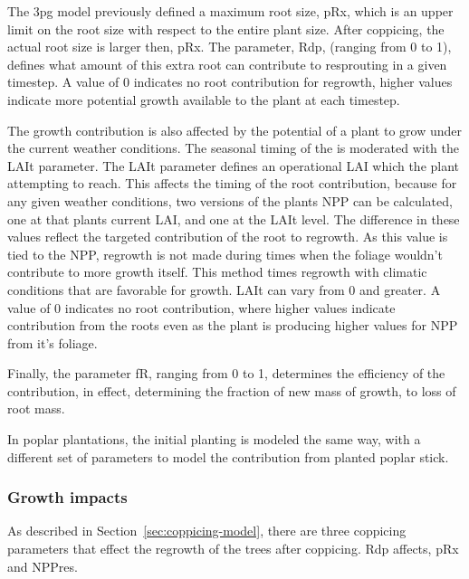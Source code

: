 \documentclass[10pt]{article}
\begin{document}
The \ac{3pg} model previously defined a maximum root size, \acs{pRx},
which is an upper limit on the root size with respect to the entire
plant size.  After coppicing, the actual root size is larger then,
\acs{pRx}.  The parameter, \acs{Rdp}, (ranging from 0 to 1), defines
what amount of this extra root can contribute to resprouting in a
given timestep.  A value of 0 indicates no root contribution for
regrowth, higher values indicate more potential growth available to
the plant at each timestep.

The growth contribution is also affected by the potential of a plant
to grow under the current weather conditions.  The seasonal timing of
the is moderated with the \acs{LAIt} parameter.  The \acs{LAIt}
parameter defines an operational \acs{LAI} which the plant attempting
to reach.  This affects the timing of the root contribution, because
for any given weather conditions, two versions of the plants \ac{NPP}
can be calculated, one at that plants current \acs{LAI}, and one at
the \acs{LAIt} level.  The difference in these values reflect the
targeted contribution of the root to regrowth.  As this value is
tied to the \ac{NPP}, regrowth is not made during times when the
foliage wouldn't contribute to more growth itself.  This method times
regrowth with climatic conditions that are favorable for growth.
\acs{LAIt} can vary from 0 and greater.  A value of 0 indicates no
root contribution, where higher values indicate contribution from the
roots even as the plant is producing higher values for \acs{NPP} from
it's foliage.

Finally, the parameter \acf{fR}, ranging from 0 to 1, determines the
efficiency of the contribution, in effect, determining the fraction of
new mass of growth, to loss of root mass.

In poplar plantations, the initial planting is modeled the same way,
with a different set of parameters to model the contribution from
planted poplar stick.

\subsubsection{Growth impacts}
\label{sec:growth-impacts}

As described in Section~\ref{sec:coppicing-model}, there are three
coppicing parameters that effect the regrowth of the trees after
coppicing.  \acs{Rdp} affects, \acs{pRx} and \acs{NPPres}.
\end{document}
